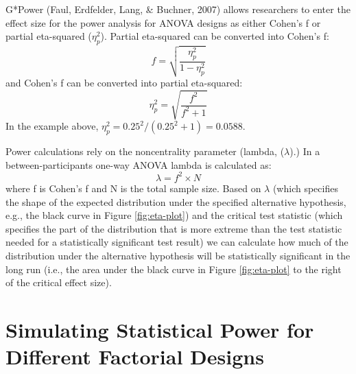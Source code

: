 \documentclass[,jou,floatsintext]{apa6}
\begin{document}
G*Power (Faul, Erdfelder, Lang, \& Buchner, 2007) allows researchers to enter the effect size for the power analysis for ANOVA designs as either Cohen's f or partial eta-squared (\(\eta_p^2\)).
Partial eta-squared can be converted into Cohen's f:
\begin{equation}
f = \sqrt{\frac{\eta_p^2}{1-\eta_p^2}} \label{eq:eta-to-f}
\end{equation}
and Cohen's f can be converted into partial eta-squared:
\begin{equation}
\eta_p^2 = \sqrt{\frac{f^2}{f^2+1}} \label{eq:f-to-eta}
\end{equation}
In the example above, \(\eta_p^2 = 0.25^2/(0.25^2+1) = 0.0588\).

Power calculations rely on the noncentrality parameter (lambda, (\(\lambda\)).)
In a between-participants one-way ANOVA lambda is calculated as:
\begin{equation}
\lambda = f^2 \times N \label{eq:lambda}
\end{equation}
where f is Cohen's f and N is the total sample size.
Based on \(\lambda\) (which specifies the shape of the expected distribution under the specified alternative hypothesis, e.g., the black curve in Figure \ref{fig:eta-plot}) and the critical test statistic (which specifies the part of the distribution that is more extreme than the test statistic needed for a statistically significant test result) we can calculate how much of the distribution under the alternative hypothesis will be statistically significant in the long run (i.e., the area under the black curve in Figure \ref{fig:eta-plot} to the right of the critical effect size).

\hypertarget{simulating-statistical-power-for-different-factorial-designs}{%
\section{Simulating Statistical Power for Different Factorial Designs}\label{simulating-statistical-power-for-different-factorial-designs}}
\end{document}
